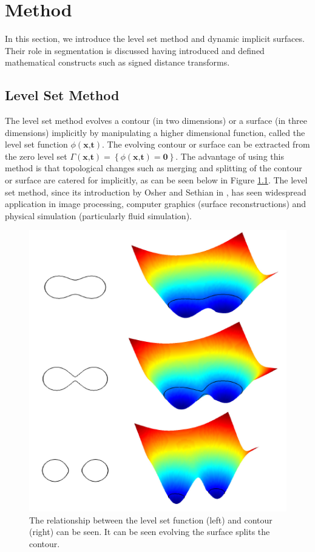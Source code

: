\chapter{Method}

In this section, we introduce the level set method and dynamic implicit surfaces. Their role in segmentation is discussed having introduced and defined mathematical constructs such as signed distance transforms.

\section{Level Set Method}\label{levelsetmethod}
The level set method evolves a contour (in two dimensions) or a surface (in three dimensions) implicitly by manipulating a higher dimensional function, called the level set function $\phi(\textbf{x,t})$. The evolving contour or surface can be extracted from the zero level set $\Gamma(\textbf{x,t})=\left\{\phi(\textbf{x,t}) = \textbf{0}\right\}$. The advantage of using this method is that topological changes such as merging and splitting of the contour or surface are catered for implicitly, as can be seen below in Figure \ref{fig:levelsets}. The level set method, since its introduction by Osher and Sethian in \cite{oshersethian}, has seen widespread application in image processing, computer graphics (surface reconstructions) and physical simulation (particularly fluid simulation).

	\begin{figure}[h]
		\centering
			\includegraphics[scale=0.4]{images/levelsets.png}
		\caption{The relationship between the level set function (left) and contour (right) can be seen. It can be seen evolving the surface splits the contour.}
		\label{fig:levelsets}
	\end{figure}

